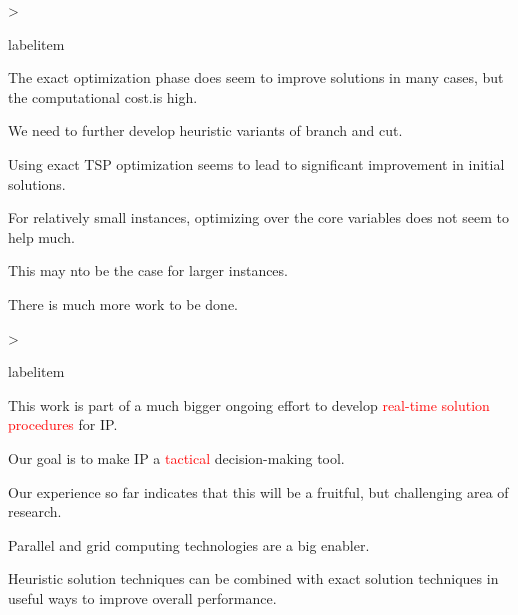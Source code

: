 \documentclass[headrule,landscape]{foils}
\makeatletter
\def\blu#1{\textcolor{blue}{#1}}
\def\red#1{\textcolor{red}{#1}}
\newcommand{\foil}[1]{\foilhead[-.6in]{\blu{#1}}}
\newcommand{\bi}{\begin{itemize}}
\newcommand{\ei}{\end{itemize}}
\newcommand{\bb}{\item}
\renewenvironment{itemize}[1][0pt]{%
  \ifnum \@itemdepth >\thr@@\@toodeep\else
    \advance\@itemdepth\@ne
    \edef\@itemitem{labelitem\romannumeral\the\@itemdepth}%
    \expandafter
    \list
      \csname\@itemitem\endcsname
      {\def\makelabel##1{\hss\llap{##1}}}\itemsep=#1%
  \fi
}{\endlist}
\makeatother
\begin{document}

\foil{Computational Results: Early Lessons}

\bi
\bb The exact optimization phase does seem to improve solutions in many cases,
but the computational cost.is high.
\bb We need to further develop heuristic variants of branch and cut.
\bb Using exact TSP optimization seems to lead to significant
improvement in initial solutions.
\bb For relatively small instances, optimizing over the core variables does
not seem to help much.
\bb This may nto be the case for larger instances.
\bb There is much more work to be done.
\ei


\foil{Conclusions and Future Work}

\bi
\bb This work is part of a much bigger ongoing effort to develop \red{real-time
solution procedures} for IP.
\bb Our goal is to make IP a \red{tactical} decision-making tool. 
\bb Our experience so far indicates that this will be a fruitful, but
challenging area of research.
\bb Parallel and grid computing technologies are a big enabler. 
\bb Heuristic solution techniques can be combined with exact solution
techniques in useful ways to improve overall performance. 
\ei
\end{document}
